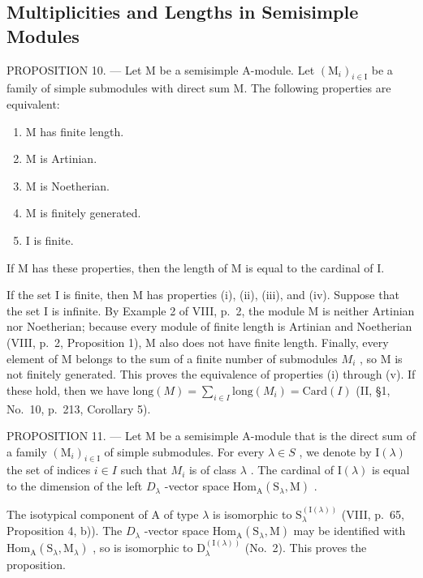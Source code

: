 \subsection{Multiplicities and Lengths in Semisimple Modules}

PROPOSITION 10. --- Let M be a semisimple A-module. Let \((\mathrm{M}_{i})_{i\in\mathrm{I}}\) be a family of simple submodules with direct sum M. The following properties are equivalent:

\begin{enumerate}
\def\labelenumi{(\roman{enumi})}
\item
  M has finite length.
\item
  M is Artinian.
\item
  M is Noetherian.
\item
  M is finitely generated.
\item
  I is finite.
\end{enumerate}

If M has these properties, then the length of M is equal to the cardinal of I.

If the set I is finite, then M has properties (i), (ii), (iii), and (iv). Suppose that the set I is infinite. By Example 2 of VIII, p.~2, the module M is neither Artinian nor Noetherian; because every module of finite length is Artinian and Noetherian (VIII, p.~2, Proposition 1), M also does not have finite length. Finally, every element of M belongs to the sum of a finite number of submodules \(M_{i}\) , so M is not finitely generated. This proves the equivalence of properties (i) through (v). If these hold, then we have \(\text{long}(M) = \sum_{i \in I} \text{long}(M_{i}) = \text{Card}(I)\) (II, §1, No.~10, p.~213, Corollary 5).

PROPOSITION 11. --- Let M be a semisimple A-module that is the direct sum of a family \((\mathrm{M}_{i})_{i\in\mathrm{I}}\) of simple submodules. For every \(\lambda\in S\) , we denote by \(\mathrm{I}(\lambda)\) the set of indices \(i\in I\) such that \(M_{i}\) is of class \(\lambda\) . The cardinal of \(\mathrm{I}(\lambda)\) is equal to the dimension of the left \(D_{\lambda}\) -vector space \(\mathrm{Hom}_{\mathrm{A}}(\mathrm{S}_{\lambda},\mathrm{M})\) .

The isotypical component of A of type \(\lambda\) is isomorphic to \(\mathrm{S}_{\lambda}^{(\mathrm{I}(\lambda))}\) (VIII, p.~65, Proposition 4, b)). The \(D_{\lambda}\) -vector space \(\mathrm{Hom}_{\mathrm{A}}(\mathrm{S}_{\lambda},\mathrm{M})\) may be identified with \(\mathrm{Hom}_{\mathrm{A}}(\mathrm{S}_{\lambda},\mathrm{M}_{\lambda})\) , so is isomorphic to \(\mathrm{D}_{\lambda}^{(\mathrm{I}(\lambda))}\) (No.~2). This proves the proposition.

